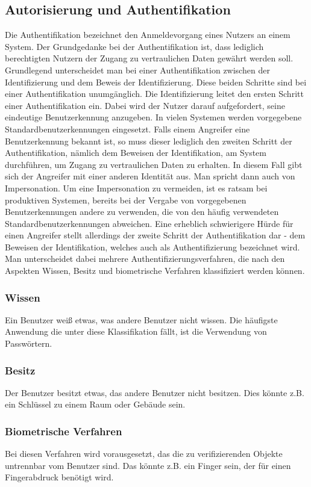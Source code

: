 \subsection{Autorisierung und Authentifikation}
Die Authentifikation bezeichnet den Anmeldevorgang eines Nutzers an einem
System. Der Grundgedanke bei der Authentifikation ist, dass lediglich
berechtigten Nutzern der Zugang zu vertraulichen Daten gewährt werden soll.
Grundlegend unterscheidet man bei einer Authentifikation zwischen der
Identifizierung und dem Beweis der Identifizierung. Diese beiden Schritte sind
bei einer Authentifikation unumgänglich. Die Identifizierung leitet den ersten
Schritt einer Authentifikation ein. Dabei wird der Nutzer darauf aufgefordert,
seine eindeutige Benutzerkennung anzugeben. In vielen Systemen werden
vorgegebene Standardbenutzerkennungen eingesetzt. Falls einem Angreifer eine
Benutzerkennung bekannt ist, so muss dieser lediglich den zweiten Schritt der
Authentifikation, nämlich dem Beweisen der Identifikation, am System
durchführen, um Zugang zu vertraulichen Daten zu erhalten. In diesem Fall gibt
sich der Angreifer mit einer anderen Identität aus. Man spricht dann auch von
Impersonation. Um eine Impersonation zu vermeiden, ist es ratsam bei produktiven
Systemen, bereits bei der Vergabe von vorgegebenen Benutzerkennungen andere zu
verwenden, die von den häufig verwendeten Standardbenutzerkennungen abweichen.
Eine erheblich schwierigere Hürde für einen Angreifer stellt allerdings der
zweite Schritt der Authentifikation dar - dem Beweisen der Identifikation,
welches auch als Authentifizierung bezeichnet wird.
Man unterscheidet dabei mehrere Authentifizierungsverfahren, die nach den
Aspekten Wissen, Besitz und biometrische Verfahren klassifiziert werden können.

\subsubsection{Wissen}
Ein Benutzer weiß etwas, was andere Benutzer nicht wissen. Die häufigste
Anwendung die unter diese Klassifikation fällt, ist die Verwendung von
Passwörtern.

\subsubsection{Besitz}
Der Benutzer besitzt etwas, das andere Benutzer nicht besitzen. Dies könnte z.B.
ein Schlüssel zu einem Raum oder Gebäude sein.

\subsubsection{Biometrische Verfahren}
Bei diesen Verfahren wird vorausgesetzt, das die zu verifizierenden Objekte
untrennbar vom Benutzer sind. Das könnte z.B. ein Finger sein, der für einen
Fingerabdruck benötigt wird.

